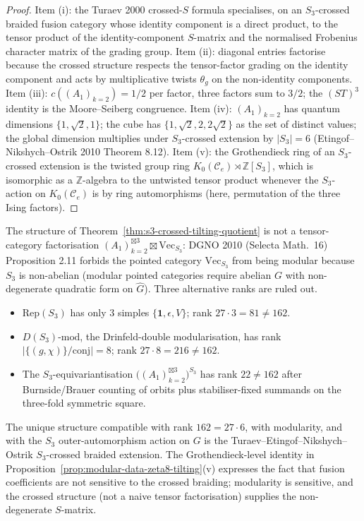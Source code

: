 \begin{proof}
Item (i): the Turaev 2000 crossed-$S$ formula specialises, on an $S_3$-crossed braided fusion category whose identity component is a direct product, to the tensor product of the identity-component $S$-matrix and the normalised Frobenius character matrix of the grading group. Item (ii): diagonal entries factorise because the crossed structure respects the tensor-factor grading on the identity component and acts by multiplicative twists $\theta_g$ on the non-identity components. Item (iii): $c((A_1)_{k=2}) = 1/2$ per factor, three factors sum to $3/2$; the $(ST)^{3}$ identity is the Moore--Seiberg congruence. Item (iv): $(A_1)_{k=2}$ has quantum dimensions $\{1,\sqrt{2},1\}$; the cube has $\{1,\sqrt{2},2,2\sqrt{2}\}$ as the set of distinct values; the global dimension multiplies under $S_3$-crossed extension by $|S_3| = 6$ (Etingof--Nikshych--Ostrik 2010 Theorem 8.12). Item (v): the Grothendieck ring of an $S_3$-crossed extension is the twisted group ring $K_0(\mathcal{C}_e)\rtimes\mathbb{Z}[S_3]$, which is isomorphic as a $\mathbb{Z}$-algebra to the untwisted tensor product whenever the $S_3$-action on $K_0(\mathcal{C}_e)$ is by ring automorphisms (here, permutation of the three Ising factors).
\end{proof}

\begin{remark}
\label{rem:alt-factorisations-ruled-out-zeta8}
The structure of Theorem~\ref{thm:s3-crossed-tilting-quotient} is not a tensor-category factorisation $(A_1)_{k=2}^{\boxtimes 3}\boxtimes\mathrm{Vec}_{S_3}$: DGNO 2010 (Selecta Math.\ 16) Proposition 2.11 forbids the pointed category $\mathrm{Vec}_{S_3}$ from being modular because $S_3$ is non-abelian (modular pointed categories require abelian $G$ with non-degenerate quadratic form on $\widehat{G}$). Three alternative ranks are ruled out.
\begin{itemize}
\item $\mathrm{Rep}(S_3)$ has only $3$ simples $\{\mathbf{1},\epsilon,V\}$; rank $27\cdot 3 = 81\neq 162$.
\item $D(S_3)$-$\mathrm{mod}$, the Drinfeld-double modularisation, has rank $|\{(g,\chi)\}/\text{conj}| = 8$; rank $27\cdot 8 = 216\neq 162$.
\item The $S_3$-equivariantisation $\bigl((A_1)_{k=2}^{\boxtimes 3}\bigr)^{S_3}$ has rank $22\neq 162$ after Burnside/Brauer counting of orbits plus stabiliser-fixed summands on the three-fold symmetric square.
\end{itemize}
The unique structure compatible with rank $162 = 27\cdot 6$, with modularity, and with the $S_3$ outer-automorphism action on $G$ is the Turaev--Etingof--Nikshych--Ostrik $S_3$-crossed braided extension. The Grothendieck-level identity in Proposition~\ref{prop:modular-data-zeta8-tilting}(v) expresses the fact that fusion coefficients are not sensitive to the crossed braiding; modularity is sensitive, and the crossed structure (not a naive tensor factorisation) supplies the non-degenerate $S$-matrix.
\end{remark}

